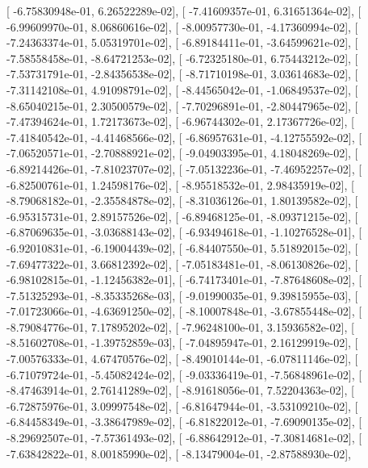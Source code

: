 \documentclass{article}
\begin{document}
       [ -6.75830948e-01,   6.26522289e-02],
       [ -7.41609357e-01,   6.31651364e-02],
       [ -6.99609970e-01,   8.06860616e-02],
       [ -8.00957730e-01,  -4.17360994e-02],
       [ -7.24363374e-01,   5.05319701e-02],
       [ -6.89184411e-01,  -3.64599621e-02],
       [ -7.58558458e-01,  -8.64721253e-02],
       [ -6.72325180e-01,   6.75443212e-02],
       [ -7.53731791e-01,  -2.84356538e-02],
       [ -8.71710198e-01,   3.03614683e-02],
       [ -7.31142108e-01,   4.91098791e-02],
       [ -8.44565042e-01,  -1.06849537e-02],
       [ -8.65040215e-01,   2.30500579e-02],
       [ -7.70296891e-01,  -2.80447965e-02],
       [ -7.47394624e-01,   1.72173673e-02],
       [ -6.96744302e-01,   2.17367726e-02],
       [ -7.41840542e-01,  -4.41468566e-02],
       [ -6.86957631e-01,  -4.12755592e-02],
       [ -7.06520571e-01,  -2.70888921e-02],
       [ -9.04903395e-01,   4.18048269e-02],
       [ -6.89214426e-01,  -7.81023707e-02],
       [ -7.05132236e-01,  -7.46952257e-02],
       [ -6.82500761e-01,   1.24598176e-02],
       [ -8.95518532e-01,   2.98435919e-02],
       [ -8.79068182e-01,  -2.35584878e-02],
       [ -8.31036126e-01,   1.80139582e-02],
       [ -6.95315731e-01,   2.89157526e-02],
       [ -6.89468125e-01,  -8.09371215e-02],
       [ -6.87069635e-01,  -3.03688143e-02],
       [ -6.93494618e-01,  -1.10276528e-01],
       [ -6.92010831e-01,  -6.19004439e-02],
       [ -6.84407550e-01,   5.51892015e-02],
       [ -7.69477322e-01,   3.66812392e-02],
       [ -7.05183481e-01,  -8.06130826e-02],
       [ -6.98102815e-01,  -1.12456382e-01],
       [ -6.74173401e-01,  -7.87648608e-02],
       [ -7.51325293e-01,  -8.35335268e-03],
       [ -9.01990035e-01,   9.39815955e-03],
       [ -7.01723066e-01,  -4.63691250e-02],
       [ -8.10007848e-01,  -3.67855448e-02],
       [ -8.79084776e-01,   7.17895202e-02],
       [ -7.96248100e-01,   3.15936582e-02],
       [ -8.51602708e-01,  -1.39752859e-03],
       [ -7.04895947e-01,   2.16129919e-02],
       [ -7.00576333e-01,   4.67470576e-02],
       [ -8.49010144e-01,  -6.07811146e-02],
       [ -6.71079724e-01,  -5.45082424e-02],
       [ -9.03336419e-01,  -7.56848961e-02],
       [ -8.47463914e-01,   2.76141289e-02],
       [ -8.91618056e-01,   7.52204363e-02],
       [ -6.72875976e-01,   3.09997548e-02],
       [ -6.81647944e-01,  -3.53109210e-02],
       [ -6.84458349e-01,  -3.38647989e-02],
       [ -6.81822012e-01,  -7.69090135e-02],
       [ -8.29692507e-01,  -7.57361493e-02],
       [ -6.88642912e-01,  -7.30814681e-02],
       [ -7.63842822e-01,   8.00185990e-02],
       [ -8.13479004e-01,  -2.87588930e-02],
\end{document}
